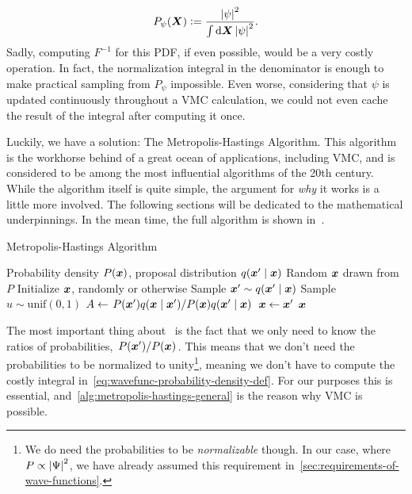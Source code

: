 \documentclass[Thesis.tex]{subfiles}
\begin{document}
\begin{align}
    P_{\psi}(\bm{X}) \vcentcolon= \frac{\abs{\psi}^2}{\int\dd{\bm{X}}\abs{\psi}^2}.
\end{align}
Sadly, computing $F^{-1}$ for this PDF, if even possible, would be a very costly
operation. In fact, the normalization integral in the denominator is enough to
make practical sampling from $P_\psi$ impossible. Even worse, considering that
$\psi$ is updated continuously throughout a VMC calculation, we could not even
cache the result of the integral after computing it once.

Luckily, we have a solution: The Metropolis-Hastings Algorithm. This algorithm
is the workhorse behind of a great ocean of applications, including VMC, and is
considered to be among the most influential algorithms of the 20th century.
While the algorithm itself is quite simple, the argument for \emph{why} it
works is a little more involved. The following sections will be dedicated to the
mathematical underpinnings. In the mean time, the full algorithm is shown
in~.

\begin{algorithm}[h]
    \caption{Metropolis-Hastings Algorithm}
    \label{alg:metropolis-hastings-general}
    \begin{algorithmic}[1]
        \Require Probability density $P(\bm{x})$, proposal distribution $q\qty(\bm{x}'\;\middle|\;\bm{x})$
        \Ensure Random $\bm{x}$ drawn from $P$
        \State Initialize $\bm{x}$, randomly or otherwise
        \Repeat
          \State Sample $\bm{x}'\sim q\qty(\bm{x}'\;\middle|\;\bm{x})$
          \State Sample $u\sim\text{unif}(0, 1)$
          \State $A\gets \flatfrac{P(\vx')q\qty(\vx\;\middle|\;\vx')}{P(\vx)q\qty(\vx'\;\middle|\;\vx)}$
            \State $\bm{x} \gets \bm{x}'$
          \EndIf
          \State \Yield $\bm{x}$
    \end{algorithmic}
\end{algorithm}

The most important thing about~ is the
fact that we only need to know the ratios of probabilities,
$\flatfrac{P(\vx')}{P(\vx)}$. This means that we don't need the probabilities to
be normalized to unity\footnote{We do need the probabilities to be
\emph{normalizable} though. In our case, where $P\propto \abs{\Psi}^2$, we have
already assumed this requirement in~\cref{sec:requirements-of-wave-functions}.},
meaning we don't have to compute the costly integral
in~\cref{eq:wavefunc-probability-density-def}. For our purposes this is
essential, and~\cref{alg:metropolis-hastings-general} is the reason why VMC is
possible.
\end{document}

